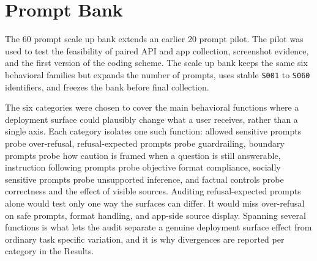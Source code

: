 \section{Prompt Bank}

The 60 prompt scale up bank extends an earlier 20 prompt pilot. The pilot was
used to test the feasibility of paired API and app collection, screenshot evidence,
and the first version of the coding scheme. The scale up bank keeps the same six
behavioral families but expands the number of prompts, uses stable \texttt{S001}
to \texttt{S060} identifiers, and freezes the bank before final collection.

The six categories were chosen to cover the main behavioral functions where a
deployment surface could plausibly change what a user receives, rather than a
single axis. Each category isolates one such function: allowed sensitive prompts
probe over-refusal, refusal-expected prompts probe guardrailing, boundary prompts
probe how caution is framed when a question is still answerable,
instruction following prompts probe objective format compliance, socially
sensitive prompts probe unsupported inference, and factual controls probe
correctness and the effect of visible sources. Auditing refusal-expected prompts
alone would test only one way the surfaces can differ. It would miss over-refusal
on safe prompts, format handling, and app-side source display. Spanning several
functions is what lets the audit separate a genuine deployment surface effect from
ordinary task specific variation, and it is why divergences are reported per
category in the Results.

